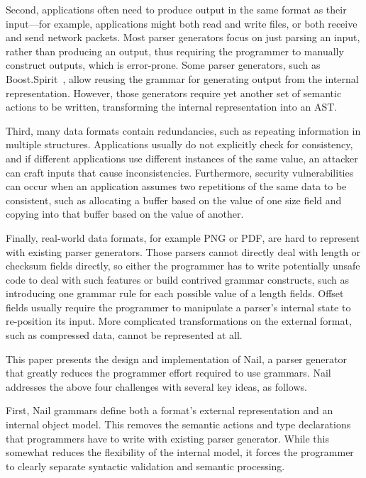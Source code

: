 Second,  applications often need to produce output in the same
format as their input---for example, applications might both
read and write files, or both receive and send network packets.
Most parser generators focus on just parsing an input, rather
than producing an output, thus requiring the programmer to manually
construct outputs, which is error-prone.  Some parser generators, such as
Boost.Spirit~\cite{boost-spirit},
allow reusing the grammar for generating output from the internal
representation.  However, those generators require yet another set of
semantic actions to be written, transforming the internal representation
into an AST\@.

Third, many data formats contain redundancies, such as repeating information in multiple structures.
Applications usually do not explicitly check for consistency, and if different applications use
different instances of the same value, an attacker can craft inputs that cause inconsistencies.
Furthermore, security vulnerabilities can occur when an application assumes two repetitions of the
same data to be consistent, such as allocating a buffer based on the value of one size field and copying into
that buffer based on the value of another.

Finally, real-world data formats, for example PNG or PDF,  are hard to represent with
existing parser generators. Those parsers cannot directly deal with length or checksum fields
directly, so either the programmer has to write potentially unsafe code to deal with such features
or build contrived grammar constructs, such as introducing one grammar rule for each possible value
of a length fields. Offset fields usually require the programmer to manipulate a parser's internal
state to re-position its input. More complicated transformations on the external format, such as
compressed data, cannot be represented at all.



This paper presents the design and implementation of Nail, a parser generator that greatly reduces
the programmer effort required to use grammars. Nail addresses the above four challenges with
several key ideas, as follows.

First, Nail grammars define both a format's external representation and an internal object model.
This removes the semantic actions and type declarations that programmers have to write with existing
parser generator. While this somewhat reduces the flexibility of the internal model, it forces the programmer
to clearly separate syntactic validation and semantic processing.

